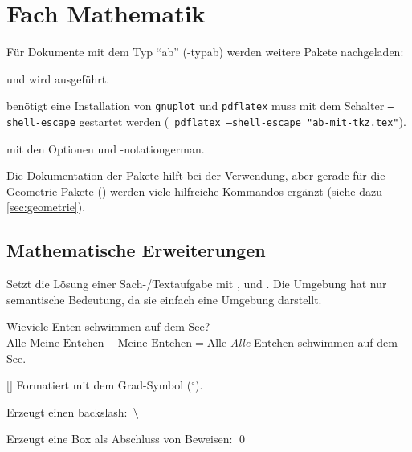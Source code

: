 \section{Fach Mathematik}\label{sec:fachmathe}

Für Dokumente mit dem Typ \enquote{ab} (\keyis*-{typ}{ab}) werden weitere Pakete nachgeladen:
\begin{multicols}{2}
	\begin{smallitemize}
		\item {}
		\item {}
		\item {}
		\item {}
		\item {}
		\item {}
		\item {} und  wird ausgeführt.
		\item {} benötigt eine Installation von \texttt{gnuplot} und \texttt{pdflatex} muss mit dem Schalter \texttt{--shell-escape} gestartet werden (\zB\  \texttt{pdflatex --shell-escape "ab-mit-tkz.tex"}).
		\item {} mit den Optionen  und \keyis*-{notation}{german}.
		\item {}
		\item {}
	\end{smallitemize}
\end{multicols}

Die Dokumentation der Pakete hilft bei der Verwendung, aber gerade für die Geometrie-Pakete () werden viele hilfreiche Kommandos ergänzt (siehe dazu \ref{sec:geometrie}).

\subsection{Mathematische Erweiterungen}\label{sec:allgemeinmathe}
\begin{environments}
	Setzt die Lösung einer Sach-/Textaufgabe mit ,  und . Die Umgebung hat nur semantische Bedeutung, da sie einfach eine  Umgebung darstellt.
	
	\begin{example}
		\begin{sachaufgabe}
			\frage Wieviele Enten schwimmen auf dem See?
			\rechnung $\text{Alle Meine Entchen} - \text{Meine Entchen} = \text{Alle}$
			\antwort \emph{Alle} Entchen schwimmen auf dem See.
		\end{sachaufgabe}
	\end{example}
\end{environments}
\begin{commands}
	[] Formatiert  mit dem Grad-Symbol ($^\circ$).
	
	 Erzeugt einen backslash: $\,\backslash\,$
	
	 Erzeugt eine Box als Abschluss von Beweisen: \qed
\end{commands}

